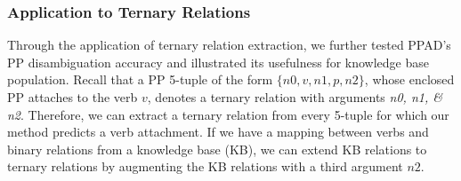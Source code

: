 \subsubsection{Application to Ternary Relations} \label{ternary}
Through the application of ternary relation extraction,  we further tested PPAD's PP disambiguation accuracy and  illustrated its usefulness for knowledge base population.
Recall that a PP  5-tuple of the form $\{n0, v, n1, p, n2\}$, whose enclosed PP   attaches to the verb $v$,  denotes a ternary relation with  arguments \textit{n0, n1, \& n2}.
Therefore, we can extract a ternary relation from every 5-tuple for which our method predicts a verb attachment.   If we have a mapping between verbs and binary relations from a knowledge base (KB), we can extend KB relations to ternary relations by augmenting the KB relations with a third argument $n2$. 


